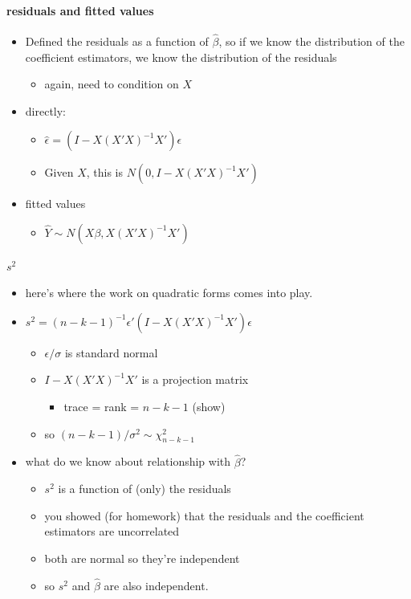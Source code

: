 \paragraph{residuals and fitted values}
\begin{itemize}
\item Defined the residuals as a function of $\hat\beta$, so if we
        know the distribution of the coefficient estimators, we know the
        distribution of the residuals
\begin{itemize}
\item again, need to condition on $X$
\end{itemize}
\item directly:
\begin{itemize}
\item $\hat\epsilon = (I - X(X'X)^{-1}X') \epsilon$
\item Given $X$, this is $N(0, I - X(X'X)^{-1}X')$
\end{itemize}
\item fitted values
\begin{itemize}
\item $\hat Y \sim N(X\beta, X(X'X)^{-1}X')$
\end{itemize}
\end{itemize}
\paragraph{$s^2$}
\label{sec-3-3-3}

\begin{itemize}
\item here's where the work on quadratic forms comes into play.
\item $s^2 = (n-k-1)^{-1} \epsilon' (I - X(X'X)^{-1}X') \epsilon$
\begin{itemize}
\item $\epsilon/\sigma$ is standard normal
\item $I - X(X'X)^{-1}X'$ is a projection matrix
\begin{itemize}
\item trace = rank = $n - k - 1$ (show)
\end{itemize}
\item so $(n-k-1)/\sigma^2 \sim \chi^2_{n-k-1}$
\end{itemize}
\item what do we know about relationship with $\hat\beta$?
\begin{itemize}
\item $s^2$ is a function of (only) the residuals
\item you showed (for homework) that the residuals and the
          coefficient estimators are uncorrelated
\item both are normal so they're independent
\item so $s^2$ and $\hat\beta$ are also independent.
\end{itemize}
\end{itemize}

